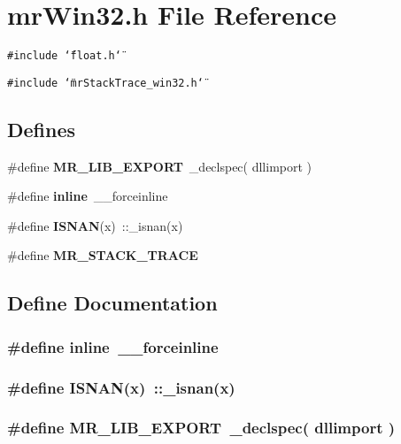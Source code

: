 \section{mr\-Win32.h File Reference}
\label{mrWin32_8h}
{\tt \#include \char`\"{}float.h\char`\"{}}\par
{\tt \#include \char`\"{}mr\-Stack\-Trace\_\-win32.h\char`\"{}}\par
\subsection*{Defines}
\begin{CompactItemize}
\item 
\#define {\bf MR\_\-LIB\_\-EXPORT}\ \_\-declspec( dllimport )
\item 
\#define {\bf inline}\ \_\-\_\-forceinline
\item 
\#define {\bf ISNAN}(x)\ ::\_\-isnan(x)
\item 
\#define {\bf MR\_\-STACK\_\-TRACE}
\end{CompactItemize}


\subsection{Define Documentation}
\subsubsection{\setlength{\rightskip}{0pt plus 5cm}\#define inline\ \_\-\_\-forceinline}\label{mrWin32_8h_a1}


\subsubsection{\setlength{\rightskip}{0pt plus 5cm}\#define ISNAN(x)\ ::\_\-isnan(x)}\label{mrWin32_8h_a2}


\subsubsection{\setlength{\rightskip}{0pt plus 5cm}\#define MR\_\-LIB\_\-EXPORT\ \_\-declspec( dllimport )}\label{mrWin32_8h_a0}


